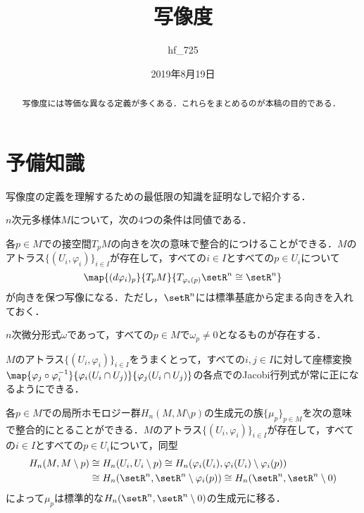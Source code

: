 \documentclass[uplatex]{jsarticle}
\title{写像度}
\author{hf\_725}
\date{2019年8月19日}
\begin{document}
\maketitle

\begin{abstract}
    写像度には等価な異なる定義が多くある．これらをまとめるのが本稿の目的である．
\end{abstract}

\section{予備知識}
写像度の定義を理解するための最低限の知識を証明なしで紹介する．

\begin{theorem}\label{orientability}
$n$次元多様体$M$について，次の4つの条件は同値である．
\begin{enumarabicp}
\item 各$p\in M$での接空間$T_p M$の向きを次の意味で整合的につけることができる．$M$のアトラス$\{(U_i,\varphi_i)\}_{i\in I}$が存在して，すべての$i\in I$とすべての$p\in U_i$について
\[ \map{(d\varphi_i)_p}{T_p M}{T_{\varphi_i(p)} \setR^n\cong \setR^n} \]
が向きを保つ写像になる．ただし，$\setR^n$には標準基底から定まる向きを入れておく．

\item $n$次微分形式$\omega$であって，すべての$p\in M$で$\omega_p\neq 0$となるものが存在する．

\item $M$のアトラス$\{(U_i,\varphi_i)\}_{i\in I}$をうまくとって，すべての$i,j\in I$に対して座標変換$\map{\varphi_j\circ \varphi_i^{-1}}{\varphi_i(U_i\cap U_j)}{\varphi_j(U_i\cap U_j)}$の各点でのJacobi行列式が常に正になるようにできる．

\item 各$p\in M$での局所ホモロジー群$H_n(M,M\setminus p)$の生成元の族$\{\mu_p\}_{p\in M}$を次の意味で整合的にとることができる．$M$のアトラス$\{(U_i,\varphi_i)\}_{i\in I}$が存在して，すべての$i\in I$とすべての$p\in U_i$について，同型
\begin{align*}
    H_n(M,M\setminus p) &\cong H_n(U_i,U_i\setminus p) \cong H_n(\varphi_i(U_i),\varphi_i(U_i)\setminus \varphi_i(p)) \\
    &\cong H_n(\setR^n,\setR^n\setminus \varphi_i(p)) \cong H_n(\setR^n,\setR^n\setminus 0)
\end{align*}
によって$\mu_p$は標準的な$H_n(\setR^n,\setR^n\setminus 0)$の生成元に移る．
\end{enumarabicp}
\end{theorem}
\end{document}

